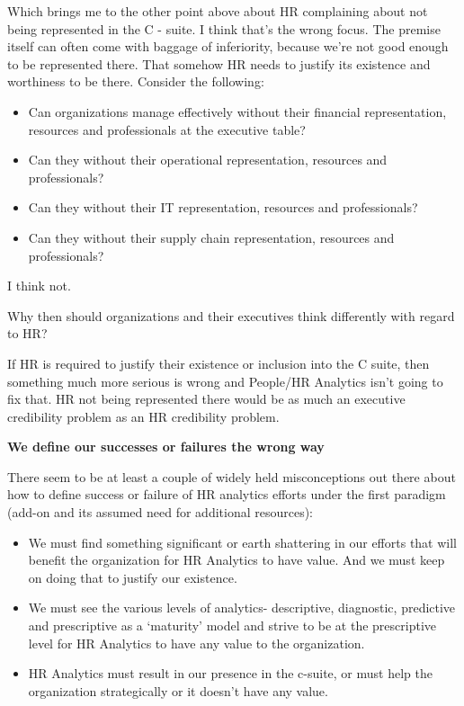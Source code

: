 \documentclass[12pt,letterpaper]{article}
\begin{document}
Which brings me to the other point above about HR complaining about not
being represented in the C - suite. I think that's the wrong focus. The
premise itself can often come with baggage of inferiority, because we're
not good enough to be represented there. That somehow HR needs to
justify its existence and worthiness to be there. Consider the
following:

\begin{itemize}
\item
  Can organizations manage effectively without their financial
  representation, resources and professionals at the executive table?
\item
  Can they without their operational representation, resources and
  professionals?
\item
  Can they without their IT representation, resources and professionals?
\item
  Can they without their supply chain representation, resources and
  professionals?
\end{itemize}

I think not.

Why then should organizations and their executives think differently
with regard to HR?

If HR is required to justify their existence or inclusion into the C
suite, then something much more serious is wrong and People/HR Analytics
isn't going to fix that. HR not being represented there would be as much
an executive credibility problem as an HR credibility problem.

\textbf{We define our successes or failures the wrong way}

There seem to be at least a couple of widely held misconceptions out
there about how to define success or failure of HR analytics efforts
under the first paradigm (add-on and its assumed need for additional
resources):

\begin{itemize}
\item
  We must find something significant or earth shattering in our efforts
  that will benefit the organization for HR Analytics to have value. And
  we must keep on doing that to justify our existence.
\item
  We must see the various levels of analytics- descriptive, diagnostic,
  predictive and prescriptive as a `maturity' model and strive to be at
  the prescriptive level for HR Analytics to have any value to the
  organization.
\item
  HR Analytics must result in our presence in the c-suite, or must help
  the organization strategically or it doesn't have any value.
\end{itemize}
\end{document}
